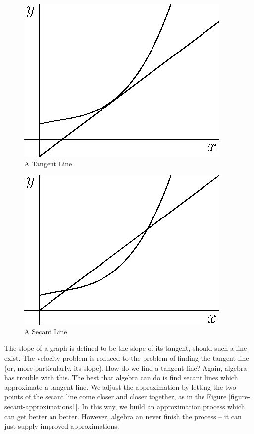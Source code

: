 \documentclass[fleqn]{report}
\begin{document}
\begin{figure}[t]
\centering
\includegraphics{figure11.eps}
\caption{A Tangent Line}
\label{figure-tangent-line}
\end{figure}

\begin{figure}[t]
\centering
\includegraphics{figure12.eps}
\caption{A Secant Line}
\label{figure-secant-line}
\end{figure}

The slope of a graph is defined to be the slope of its
tangent, should such a line exist. The velocity problem is
reduced to the problem of finding the tangent line (or, more
particularly, its slope). How do we find a tangent line?
Again, algebra has trouble with this.  The best that algebra
can do is find secant lines which approximate a tangent line.
We adjust the approximation by letting the two points of the
secant line come closer and closer together, as in the Figure
\ref{figure-secant-approximations1}. In this way, we build an
approximation process which can get better an better. However,
algebra an never finish the process -- it can just supply
improved approximations.
\end{document}

